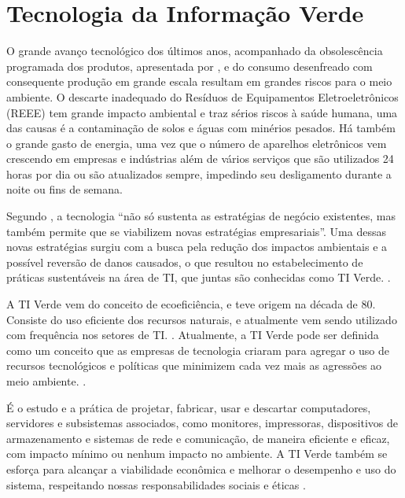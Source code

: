 \section{Tecnologia da Informação Verde}

O grande avanço tecnológico dos últimos anos, acompanhado da obsolescência programada dos produtos, apresentada por , e do consumo desenfreado com consequente produção em grande escala resultam em grandes riscos para o meio ambiente. O descarte inadequado do Resíduos de Equipamentos Eletroeletrônicos (REEE) tem grande impacto ambiental e traz sérios riscos à saúde humana, uma das causas é a contaminação de solos e águas com minérios pesados. Há também o grande gasto de energia, uma vez que o número de aparelhos eletrônicos vem crescendo em empresas e indústrias além de vários serviços que são utilizados 24 horas por dia ou são atualizados sempre, impedindo seu desligamento durante a noite ou fins de semana.

Segundo , a tecnologia “não só sustenta as estratégias de negócio existentes, mas também permite que se viabilizem novas estratégias empresariais”. Uma dessas novas estratégias surgiu com a busca pela redução dos impactos ambientais e a possível reversão de danos causados, o que resultou no estabelecimento de práticas sustentáveis na área de TI, que juntas são conhecidas como TI Verde. \cite{aguilar2009tecnologia}.

A TI Verde vem do conceito de ecoeficiência, e teve origem na década de 80. Consiste do uso eficiente dos recursos naturais, e atualmente vem sendo utilizado com frequência nos setores de TI. \cite{ferreira2009tiverde}. Atualmente, a TI Verde pode ser definida como um conceito que as empresas de tecnologia criaram para agregar o uso de recursos tecnológicos e políticas que minimizem cada vez mais as agressões ao meio ambiente. \cite{briefing2008preciso}.

\begin{citacao}
É o estudo e a prática de projetar, fabricar, usar e descartar computadores, servidores e subsistemas associados, como monitores, impressoras, dispositivos de armazenamento e sistemas de rede e comunicação, de maneira eficiente e eficaz, com impacto mínimo ou nenhum impacto no ambiente. A TI Verde também se esforça para alcançar a viabilidade econômica e melhorar o desempenho e uso do sistema, respeitando nossas responsabilidades sociais e éticas \cite{murugesan2008harnessing}.
\end{citacao} 

